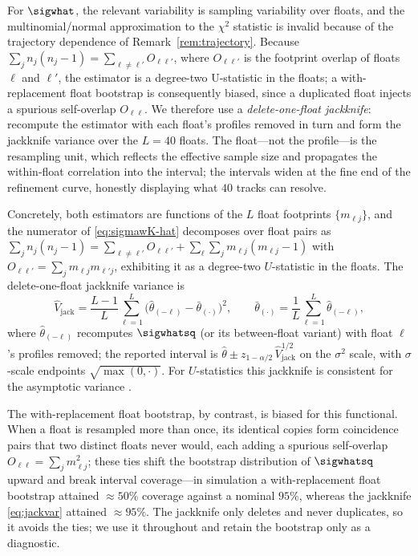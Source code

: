 For $\sigwhat$, the relevant variability is sampling variability
over floats, and the multinomial/normal approximation to the $\chi^2$
statistic is invalid because of the trajectory dependence of
Remark~\ref{rem:trajectory}. Because
$\sum_j n_j(n_j-1)=\sum_{\ell\neq\ell'}O_{\ell\ell'}$, where
$O_{\ell\ell'}$ is the footprint overlap of floats $\ell$ and $\ell'$,
the estimator is a degree-two U-statistic in the floats; a
with-replacement float bootstrap is consequently biased, since a
duplicated float injects a spurious self-overlap $O_{\ell\ell}$. We
therefore use a \emph{delete-one-float jackknife}: recompute the
estimator with each float's profiles removed in turn and form the
jackknife variance over the $L=40$ floats. The
float---not the profile---is the resampling unit, which reflects the
effective sample size and propagates the within-float correlation into
the interval; the intervals widen at the fine end of the refinement
curve, honestly displaying what $40$ tracks can resolve.

Concretely, both estimators are functions of the $L$ float footprints
$\{m_{\ell j}\}$, and the numerator of \eqref{eq:sigmawK-hat} decomposes
over float pairs as
$\sum_j n_j(n_j-1)=\sum_{\ell\ne\ell'}O_{\ell\ell'}+\sum_\ell\sum_j m_{\ell j}(m_{\ell j}-1)$
with $O_{\ell\ell'}=\sum_j m_{\ell j}m_{\ell'j}$, exhibiting it as a
degree-two $U$-statistic in the floats. The delete-one-float jackknife
variance is
\begin{equation}
  \widehat V_{\mathrm{jack}}
  =\frac{L-1}{L}\sum_{\ell=1}^{L}\big(\hat\theta_{(-\ell)}-\bar\theta_{(\cdot)}\big)^2,
  \qquad \bar\theta_{(\cdot)}=\frac1L\sum_{\ell=1}^{L}\hat\theta_{(-\ell)},
  \label{eq:jackvar}
\end{equation}
where $\hat\theta_{(-\ell)}$ recomputes $\sigwhatsq$ (or its
between-float variant) with float $\ell$'s profiles removed; the reported
interval is $\hat\theta\pm z_{1-\alpha/2}\,\widehat V_{\mathrm{jack}}^{1/2}$
on the $\sigma^2$ scale, with $\sigma$-scale endpoints
$\sqrt{\max(0,\cdot)}$. For $U$-statistics this jackknife is consistent
for the asymptotic variance \citep{arvesen1969}.

The with-replacement float bootstrap, by contrast, is biased for this
functional. When a float is resampled more than once, its identical
copies form coincidence pairs that two distinct floats never would, each
adding a spurious self-overlap $O_{\ell\ell}=\sum_j m_{\ell j}^2$; these ties shift
the bootstrap distribution of $\sigwhatsq$ upward and break
interval coverage---in simulation a with-replacement float bootstrap
attained $\approx 50\%$ coverage against a nominal $95\%$, whereas the
jackknife \eqref{eq:jackvar} attained $\approx 95\%$. The jackknife only
deletes and never duplicates, so it avoids the ties; we use it
throughout and retain the bootstrap only as a diagnostic.


